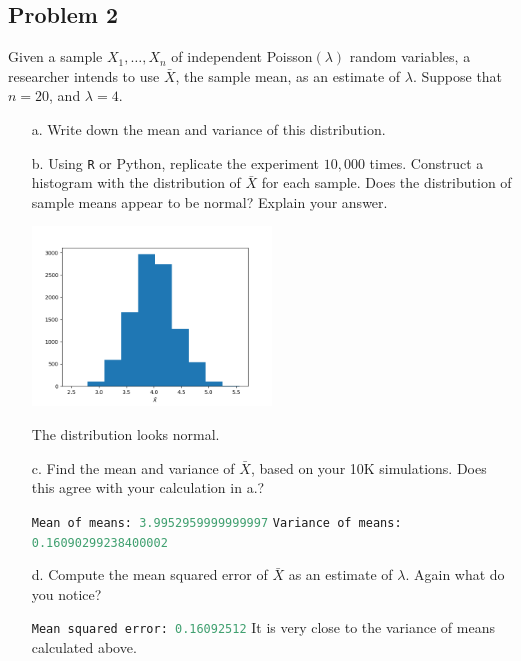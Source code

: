 \documentclass{article}
\newcommand{\1}{\mathbf{1}}
\begin{document}
\subsection*{Problem 2}
Given a sample $X_1,\ldots , X_n$  of independent Poisson$(\lambda)$ random variables, a researcher  intends to use $\bar{X}$, the sample mean, as an estimate of $\lambda$.  Suppose that $n=20$, and $\lambda=4$.
\begin{itemize}
    \item[a.] Write down the mean and variance of this distribution.
    
    \item[b.] Using {\tt R} or Python, replicate the experiment $10,000$ times. Construct a histogram with the distribution of $\bar{X}$ for each sample. Does the distribution of sample means appear to be normal? Explain your answer.
    
    \begin{center}
        \includegraphics[width=0.5\textwidth]{STATS509/HW7/HW7Figures/Problem2.png}
    \end{center}
    
    The distribution looks normal. 
    
    
    \item[c.] Find the mean and variance of $\bar{X}$, based on your 10K simulations. Does this agree with your calculation in a.?
    
    \lstinline[language=Python]{Mean of means: 3.9952959999999997}\newline
    \lstinline[language=Python]{Variance of means: 0.16090299238400002}
    
    \item[d.] Compute the mean squared error of $\bar{X}$ as an estimate of $\lambda$. Again what do you notice? 
    
    \lstinline[language=Python]{Mean squared error: 0.16092512}
    It is very close to the variance of means calculated above. 
\end{itemize}
\end{document}
